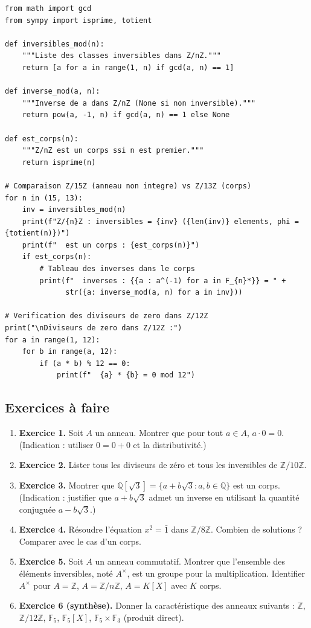 \begin{lstlisting}
from math import gcd
from sympy import isprime, totient

def inversibles_mod(n):
    """Liste des classes inversibles dans Z/nZ."""
    return [a for a in range(1, n) if gcd(a, n) == 1]

def inverse_mod(a, n):
    """Inverse de a dans Z/nZ (None si non inversible)."""
    return pow(a, -1, n) if gcd(a, n) == 1 else None

def est_corps(n):
    """Z/nZ est un corps ssi n est premier."""
    return isprime(n)

# Comparaison Z/15Z (anneau non integre) vs Z/13Z (corps)
for n in (15, 13):
    inv = inversibles_mod(n)
    print(f"Z/{n}Z : inversibles = {inv} ({len(inv)} elements, phi = {totient(n)})")
    print(f"  est un corps : {est_corps(n)}")
    if est_corps(n):
        # Tableau des inverses dans le corps
        print(f"  inverses : {{a : a^(-1) for a in F_{n}*}} = " +
              str({a: inverse_mod(a, n) for a in inv}))

# Verification des diviseurs de zero dans Z/12Z
print("\nDiviseurs de zero dans Z/12Z :")
for a in range(1, 12):
    for b in range(a, 12):
        if (a * b) % 12 == 0:
            print(f"  {a} * {b} = 0 mod 12")
\end{lstlisting}

\subsection{Exercices à faire}
\begin{enumerate}
    \item \textbf{Exercice 1.} Soit $A$ un anneau. Montrer que pour tout $a \in A$, $a \cdot 0 = 0$. (Indication : utiliser $0 = 0 + 0$ et la distributivité.)
    \item \textbf{Exercice 2.} Lister tous les diviseurs de zéro et tous les inversibles de $\mathbb{Z}/10\mathbb{Z}$.
    \item \textbf{Exercice 3.} Montrer que $\mathbb{Q}[\sqrt{3}] = \{a + b\sqrt{3} : a, b \in \mathbb{Q}\}$ est un corps. (Indication : justifier que $a + b\sqrt{3}$ admet un inverse en utilisant la quantité conjuguée $a - b\sqrt{3}$.)
    \item \textbf{Exercice 4.} Résoudre l'équation $x^2 = \bar{1}$ dans $\mathbb{Z}/8\mathbb{Z}$. Combien de solutions ? Comparer avec le cas d'un corps.
    \item \textbf{Exercice 5.} Soit $A$ un anneau commutatif. Montrer que l'ensemble des éléments inversibles, noté $A^\times$, est un groupe pour la multiplication. Identifier $A^\times$ pour $A = \mathbb{Z}$, $A = \mathbb{Z}/n\mathbb{Z}$, $A = K[X]$ avec $K$ corps.
    \item \textbf{Exercice 6 (synthèse).} Donner la caractéristique des anneaux suivants : $\mathbb{Z}$, $\mathbb{Z}/12\mathbb{Z}$, $\mathbb{F}_5$, $\mathbb{F}_5[X]$, $\mathbb{F}_5 \times \mathbb{F}_3$ (produit direct).
\end{enumerate}

